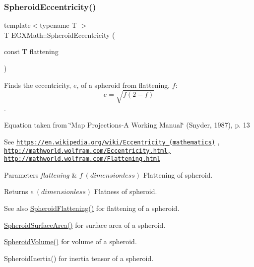 \subsubsection{\texorpdfstring{Spheroid\+Eccentricity()}{SpheroidEccentricity()}\hspace{0.1cm}{\footnotesize\ttfamily [1/2]}}
{\footnotesize\ttfamily template$<$typename T $>$ \\
T E\+G\+X\+Math\+::\+Spheroid\+Eccentricity (\begin{DoxyParamCaption}\item[{const T}]{flattening }\end{DoxyParamCaption})}



Finds the eccentricity, $e$, of a spheroid from flattening, $f$\+: \[ e = \sqrt{f (2 - f)} \]. 

Equation taken from \char`\"{}\+Map Projections-\/\+A Working Manual\char`\"{} (Snyder, 1987), p. 13

See \href{https://en.wikipedia.org/wiki/Eccentricity_(mathematics)}{\tt https\+://en.\+wikipedia.\+org/wiki/\+Eccentricity\+\_\+(mathematics)} , \href{http://mathworld.wolfram.com/Eccentricity.html,}{\tt http\+://mathworld.\+wolfram.\+com/\+Eccentricity.\+html,} \href{http://mathworld.wolfram.com/Flattening.html}{\tt http\+://mathworld.\+wolfram.\+com/\+Flattening.\+html} 
\begin{DoxyParams}{Parameters}
{\em flattening} & $ f\ (dimensionless)$ Flattening of spheroid. \\
\hline
\end{DoxyParams}
\begin{DoxyReturn}{Returns}
$ e\ (dimensionless)$ Flatness of spheroid. 
\end{DoxyReturn}
\begin{DoxySeeAlso}{See also}
\mbox{\hyperlink{group___e_g_x_math-_geometry-3_d-_spheroid-_flattening_ga640f4bcd86aa4c378819bffda31c0852}{Spheroid\+Flattening()}} for flattening of a spheroid. 

\mbox{\hyperlink{group___e_g_x_math-_geometry-3_d-_spheroid-_surface_area_ga32a21d075102ea9a235a43165675627e}{Spheroid\+Surface\+Area()}} for surface area of a spheroid. 

\mbox{\hyperlink{group___e_g_x_math-_geometry-3_d-_spheroid-_volume_gac89ed1e10e56c724b341591ecc5605dc}{Spheroid\+Volume()}} for volume of a spheroid. 

Spheroid\+Inertia() for inertia tensor of a spheroid. 
\end{DoxySeeAlso}
\mbox{\label{group___e_g_x_math-_geometry-3_d-_spheroid-_eccentricity_gab4c867532eef5a52e8e575e2a6b18bf8}} 
